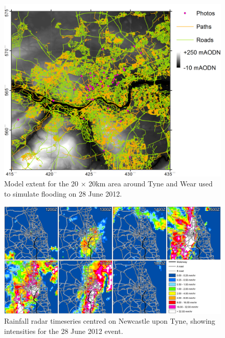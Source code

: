 \begin{figure}[tpb]
	\centering
	\includegraphics[width=1.0\textwidth]{newcastle-pluvial-figures/20km-domain-extent.png}
	\caption{Model extent for the 20 $\times$ 20km area around Tyne and Wear used to simulate flooding on 28 June 2012.}
	\label{Newcastle_Pluvial_DomainExtent}
\end{figure}
\begin{figure}
	\centering
	\includegraphics[width=1.0\textwidth]{newcastle-pluvial-figures/radar-rainfall-sequence.png}
	\caption{Rainfall radar timeseries centred on Newcastle upon Tyne, showing intensities for the 28 June 2012 event.}
	\label{Newcastle_Pluvial_Radar}
\end{figure}

